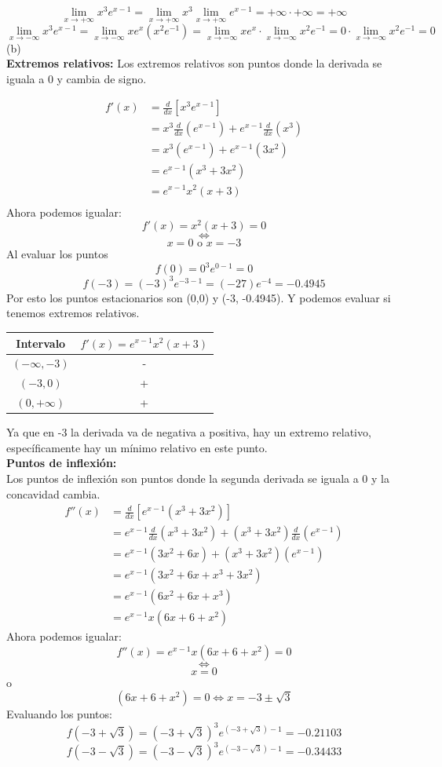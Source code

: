 \documentclass[12pt]{article}
\begin{document}
\[
 \lim_{x \to +\infty}  x^3e^{x-1} = \lim_{x \to +\infty}  x^3  \lim_{x \to +\infty} e^{x-1}  = +\infty \cdot +\infty = +\infty
\]
\[
\lim_{x \to -\infty}  x^3e^{x-1} = \lim_{x \to -\infty}  xe^{x} (x^{2}e^{-1}) =  \lim_{x \to -\infty} xe^{x} \cdot \lim_{x \to -\infty} x^{2}e^{-1} = 0 \cdot \lim_{x \to -\infty} x^{2}e^{-1} = 0
\]
 (b) \\
 \textbf{Extremos relativos:}
 Los extremos relativos son puntos donde la derivada se iguala a 0 y cambia de signo.
 
\begin{align*}
  f'(x)
  &= \frac{d}{dx} \left[x^3e^{x-1} \right]\\
  &= x^{3} \frac{d}{dx} (e^{x-1}) + e^{x-1}  \frac{d}{dx} (x^3)\\
  &= x^{3} (e^{x-1}) + e^{x-1}(3x^2)\\
  &= e^{x-1} ( x^{3}  + 3x^2 )\\
  &= e^{x-1} x^2(x+3)  \\
\end{align*}
Ahora podemos igualar:
\[
f'(x) = x^2(x+3) = 0  
\]
\[
\iff
\]
\[
x= 0 \text{ o } x = -3
\]
Al evaluar los puntos
\[
f(0)=0^3e^{0-1} = 0
\]
\[
f(-3)=(-3)^3e^{-3-1} = (-27)e^{-4} = -0.4945
\]
Por esto los puntos estacionarios son (0,0) y (-3, -0.4945). Y podemos evaluar si tenemos extremos relativos.
 \begin{table}[H]
    \centering
    \begin{tabular}{c|c}
      \hline
      Intervalo & $f'(x) = e^{x-1} x^2(x+3)   $  \\
      \hline
      $(-\infty,-3)$ & -  \\
      $(-3,0)$ & +  \\
      $(0,+\infty)$ & + \\
      \hline
    \end{tabular}
 \end{table}
 Ya que en -3 la derivada va de negativa a positiva, hay un extremo relativo, específicamente hay un mínimo relativo en este punto. \\
\textbf{Puntos de inflexión:}\\
 Los puntos de inflexión son puntos donde la segunda derivada se iguala a 0 y la concavidad cambia.
\begin{align*}
  f''(x)
  &= \frac{d}{dx} \left[ e^{x-1} ( x^{3}  + 3x^2 )   \right]\\
  &=  e^{x-1} \frac{d}{dx}( x^{3}  + 3x^2 ) +  ( x^{3}  + 3x^2 ) \frac{d}{dx} (e^{x-1}) \\
  &=  e^{x-1} ( 3x^{2}+ 6x ) +  ( x^{3}  + 3x^2 ) (e^{x-1}) \\
  &=  e^{x-1} ( 3x^{2}+ 6x  +   x^{3}  + 3x^2 ) \\
  &=  e^{x-1} ( 6x^{2}+ 6x  +   x^{3} )\\
  &=  e^{x-1} x ( 6x+ 6  +   x^{2} ) 
\end{align*}
Ahora podemos igualar:
\[
f''(x) = e^{x-1} x ( 6x+ 6  +   x^{2} )  = 0 
\]
\[
\iff
\]
\[
 x  = 0
 \]
 o
 \[
( 6x+ 6  +   x^{2} )  = 0  \iff x = -3 \pm \sqrt{3}
 \]
 Evaluando los puntos:
 \[
f(-3+ \sqrt{3}) = (-3 + \sqrt{3})^3e^{(-3 + \sqrt{3})-1} = -0.21103
\]
 \[
f(-3 - \sqrt{3}) = (-3 - \sqrt{3})^3e^{(-3 - \sqrt{3})-1} = -0.34433
 \]
\end{document}
